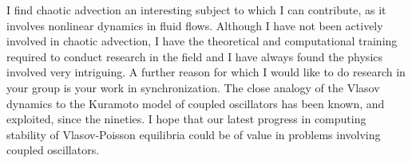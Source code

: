 \documentclass[a4paper,10pt]{article}
\begin{document}
I find chaotic advection an interesting subject to which I can contribute, as it
involves nonlinear dynamics in fluid flows. Although I have not been actively
involved in chaotic advection, I have the theoretical and computational training
required to conduct research in the field and I have always found the physics
involved very intriguing. A further reason for which I would like 
to do research in your group is your work in synchronization. 
The close analogy of the Vlasov
dynamics to the Kuramoto model of coupled oscillators has been known, and
exploited, since the nineties. I hope that our latest progress in computing
stability of Vlasov-Poisson equilibria could be of value in problems involving
coupled oscillators.



\end{document}
